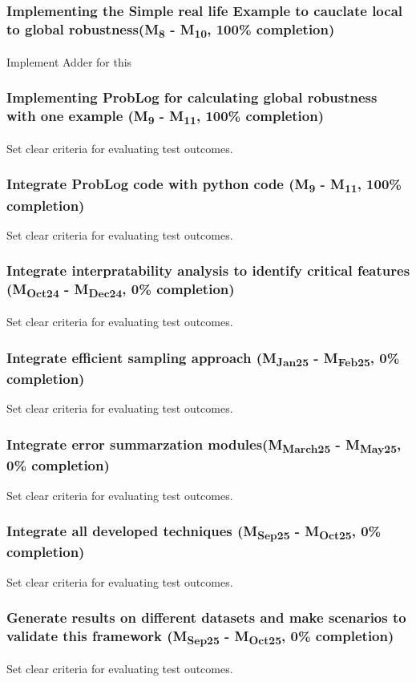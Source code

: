 \subsubsection{Implementing the Simple real life Example to cauclate local to global robustness(M\textsubscript{8} - M\textsubscript{10}, 100\% completion)}
Implement Adder for this

\subsubsection{Implementing ProbLog for  calculating global robustness with one example (M\textsubscript{9} - M\textsubscript{11}, 100\% completion)}
Set clear criteria for evaluating test outcomes.

\subsubsection{Integrate ProbLog code with python code (M\textsubscript{9} - M\textsubscript{11}, 100\% completion)}
Set clear criteria for evaluating test outcomes.

\subsubsection{Integrate interpratability analysis to identify critical features (M\textsubscript{Oct24} - M\textsubscript{Dec24}, 0\% completion)}
Set clear criteria for evaluating test outcomes.
\subsubsection{Integrate efficient sampling approach (M\textsubscript{Jan25} - M\textsubscript{Feb25}, 0\% completion)}
Set clear criteria for evaluating test outcomes.

\subsubsection{Integrate error summarzation modules(M\textsubscript{March25} - M\textsubscript{May25}, 0\% completion)}
Set clear criteria for evaluating test outcomes.
\subsubsection{Integrate all developed techniques (M\textsubscript{Sep25} - M\textsubscript{Oct25}, 0\% completion)}
Set clear criteria for evaluating test outcomes.
\subsubsection{Generate results on different datasets  and make scenarios to validate this framework (M\textsubscript{Sep25} - M\textsubscript{Oct25}, 0\% completion)}
Set clear criteria for evaluating test outcomes.





